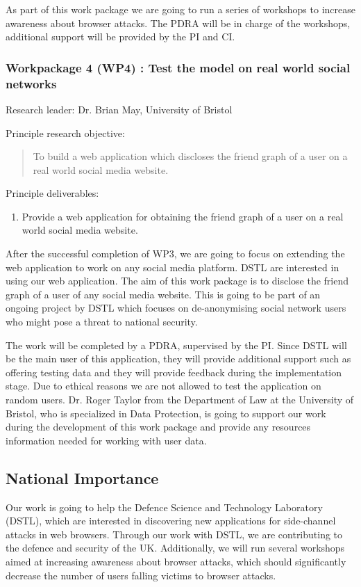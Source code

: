 \documentclass[a4paper,11pt]{article}
\begin{document}
As part of this work package we are going to run a series of workshops to increase  awareness about browser attacks. The PDRA will be in charge of the workshops, additional support will be provided by the PI and CI.

\subsubsection*{Workpackage 4 (WP4) : Test the model on real world social networks}
Research leader: Dr. Brian May, University of Bristol

Principle research objective:
\begin{quote}
	To build a web application which discloses the friend graph of a user on a real world social media website.
\end{quote}

Principle deliverables:
\begin{enumerate}
\item Provide a web application for obtaining the friend graph of a user on a real world social media website.
\end{enumerate}

After the successful completion of WP3, we are going to focus on extending the web application to work on any social media platform. DSTL are interested in using our web application. The aim of this work package is to disclose the friend graph of a user of any social media website. This is going to be part of an ongoing project by DSTL which focuses on de-anonymising social network users who might pose a threat to national security.

The work will be completed by a PDRA, supervised by the PI. Since DSTL will be the main user of this application, they will provide additional support such as offering testing data and they will provide feedback during the implementation stage. Due to ethical reasons we are not allowed to test the application on random users. Dr. Roger Taylor from the Department of Law at the University of Bristol, who is specialized in Data Protection, is going to support our work during the development of this work package and provide any resources information needed for working with user data.

\subsection*{National Importance}

Our work is going to help the Defence Science and Technology Laboratory (DSTL), which are interested in discovering new applications for side-channel attacks in web browsers. Through our work with DSTL, we are contributing to the defence and security of the UK. Additionally, we will run several workshops aimed at increasing awareness about browser attacks, which should significantly decrease the number of users falling victims to browser attacks.
\end{document}
